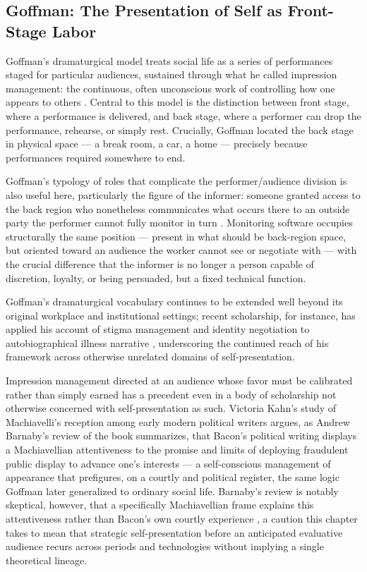 \documentclass[10pt]{article}
\begin{document}
\subsection{Goffman: The Presentation of Self as Front-Stage Labor}

Goffman's dramaturgical model treats social life as a series of performances staged for particular audiences, sustained through what he called impression management: the continuous, often unconscious work of controlling how one appears to others \cite{goffman}. Central to this model is the distinction between front stage, where a performance is delivered, and back stage, where a performer can drop the performance, rehearse, or simply rest. Crucially, Goffman located the back stage in physical space --- a break room, a car, a home --- precisely because performances required somewhere to end.

Goffman's typology of roles that complicate the performer/audience division is also useful here, particularly the figure of the informer: someone granted access to the back region who nonetheless communicates what occurs there to an outside party the performer cannot fully monitor in turn \cite{goffman}. Monitoring software occupies structurally the same position --- present in what should be back-region space, but oriented toward an audience the worker cannot see or negotiate with --- with the crucial difference that the informer is no longer a person capable of discretion, loyalty, or being persuaded, but a fixed technical function.

Goffman's dramaturgical vocabulary continues to be extended well beyond its original workplace and institutional settings; recent scholarship, for instance, has applied his account of stigma management and identity negotiation to autobiographical illness narrative \cite{almansoori}, underscoring the continued reach of his framework across otherwise unrelated domains of self-presentation.

Impression management directed at an audience whose favor must be calibrated rather than simply earned has a precedent even in a body of scholarship not otherwise concerned with self-presentation as such. Victoria Kahn's study of Machiavelli's reception among early modern political writers argues, as Andrew Barnaby's review of the book summarizes, that Bacon's political writing displays a Machiavellian attentiveness to the promise and limits of deploying fraudulent public display to advance one's interests \cite{kahn,barnaby} --- a self-conscious management of appearance that prefigures, on a courtly and political register, the same logic Goffman later generalized to ordinary social life. Barnaby's review is notably skeptical, however, that a specifically Machiavellian frame explains this attentiveness rather than Bacon's own courtly experience \cite{barnaby}, a caution this chapter takes to mean that strategic self-presentation before an anticipated evaluative audience recurs across periods and technologies without implying a single theoretical lineage.
\end{document}
